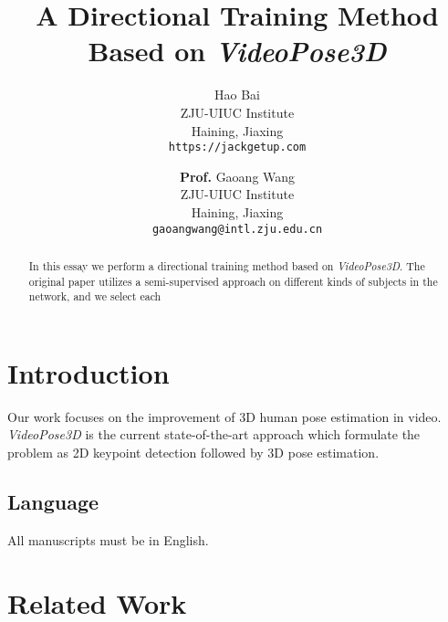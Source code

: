 \documentclass[10pt,twocolumn,letterpaper]{article}
\begin{document}
\title{A Directional Training Method Based on \textit{VideoPose3D}}

\author{Hao Bai\\
ZJU-UIUC Institute\\
Haining, Jiaxing\\
{\tt\small https://jackgetup.com}
\and
\textbf{Prof.} Gaoang Wang\\
ZJU-UIUC Institute\\
Haining, Jiaxing\\
{\tt\small gaoangwang@intl.zju.edu.cn}
}

\maketitle

\begin{abstract}
   In this essay we perform a directional training method based on \textit{VideoPose3D}. 
   The original paper utilizes a semi-supervised approach on different kinds of subjects
   in the network, and we select each 
\end{abstract}

\section{Introduction}

Our work focuses on the improvement of 3D human pose estimation in video.
\textit{VideoPose3D} is the current state-of-the-art approach which formulate
the problem as 2D keypoint detection followed by 3D pose estimation.


\subsection{Language}

All manuscripts must be in English.

\section{Related Work}
\end{document}
